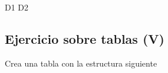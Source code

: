 \documentclass[letterpaper,10pt,spanish]{sphinxmanual}
\begin{document}
\begin{sphinxVerbatim}[commandchars=\\\{\}]
                        D1
                        D2



\end{sphinxVerbatim}


\subsection{Ejercicio sobre tablas (V)}
\label{\detokenize{tema2:ejercicio-sobre-tablas-v}}
Crea una tabla con la estructura siguiente

\begin{figure}[htbp]
\centering

\noindent{}
\end{figure}
\end{document}
